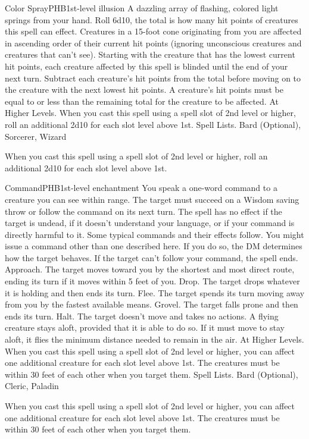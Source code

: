 \begin{spell}{Color Spray}{PHB}{1st-level illusion}
{
}
A dazzling array of flashing, colored light springs from your hand. Roll 6d10, the total is how many hit points of creatures this spell can effect. Creatures in a 15-foot cone originating from you are affected in ascending order of their current hit points (ignoring unconscious creatures and creatures that can’t see).
Starting with the creature that has the lowest current hit points, each creature affected by this spell is blinded until the end of your next turn. Subtract each creature’s hit points from the total before moving on to the creature with the next lowest hit points. A creature’s hit points must be equal to or less than the remaining total for the creature to be affected.
At Higher Levels. When you cast this spell using a spell slot of 2nd level or higher, roll an additional 2d10 for each slot level above 1st.
Spell Lists. Bard (Optional), Sorcerer, Wizard

 When you cast this spell using a spell slot of 2nd level or higher, roll an additional 2d10 for each slot level above 1st.
\end{spell}

\begin{spell}{Command}{PHB}{1st-level enchantment}
{
}
You speak a one-word command to a creature you can see within range. The target must succeed on a Wisdom saving throw or follow the command on its next turn. The spell has no effect if the target is undead, if it doesn’t understand your language, or if your command is directly harmful to it. Some typical commands and their effects follow. You might issue a command other than one described here. If you do so, the DM determines how the target behaves. If the target can’t follow your command, the spell ends.
Approach. The target moves toward you by the shortest and most direct route, ending its turn if it moves within 5 feet of you.
Drop. The target drops whatever it is holding and then ends its turn.
Flee. The target spends its turn moving away from you by the fastest available means.
Grovel. The target falls prone and then ends its turn.
Halt. The target doesn’t move and takes no actions. A flying creature stays aloft, provided that it is able to do so. If it must move to stay aloft, it flies the minimum distance needed to remain in the air.
At Higher Levels. When you cast this spell using a spell slot of 2nd level or higher, you can affect one additional creature for each slot level above 1st. The creatures must be within 30 feet of each other when you target them.
Spell Lists. Bard (Optional), Cleric, Paladin

 When you cast this spell using a spell slot of 2nd level or higher, you can affect one additional creature for each slot level above 1st. The creatures must be within 30 feet of each other when you target them.
\end{spell}

